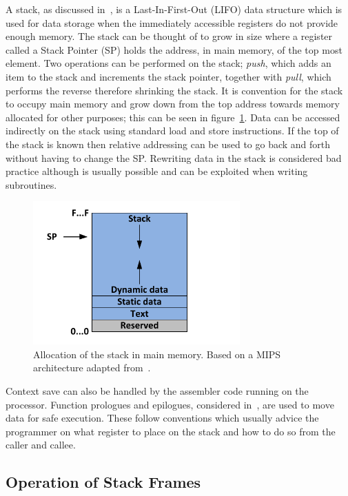 \documentclass[12pt,a4paper]{article}
\begin{document}



A stack, as discussed in~\cite{stack}, is a Last-In-First-Out (LIFO) data structure which is used for data storage when the immediately accessible registers do not provide enough memory.
The stack can be thought of to grow in size where a register called a Stack Pointer (SP) holds the address, in main memory, of the top most element.
Two operations can be performed on the stack; \emph{push}, which adds an item to the stack and increments the stack pointer, together with \emph{pull}, which performs the reverse therefore shrinking the stack. 
It is convention for the stack to occupy main memory and grow down from the top address towards memory allocated for other purposes; this can be seen in figure~\ref{fig:allocation}.
Data can be accessed indirectly on the stack using standard load and store instructions. 
If the top of the stack is known then relative addressing can be used to go back and forth without having to change the SP.
Rewriting data in the stack is considered bad practice although is usually possible and can be exploited when writing subroutines.

\begin{figure}[htb]
   \centering
   \includegraphics[height=5.5cm]{Figures/allocation.pdf}
   \caption{Allocation of the stack in main memory. Based on a MIPS architecture adapted from~\cite{stack}.}
   \label{fig:allocation}
\end{figure}

Context save can also be handled by the assembler code running on the processor.
Function prologues and epilogues, considered in~\cite{proWiki,pro}, are used to move data for safe execution.
These follow conventions which usually advice the programmer on what register to place on the stack and how to do so from the caller and callee.




\subsection{Operation of Stack Frames}
\end{document}
